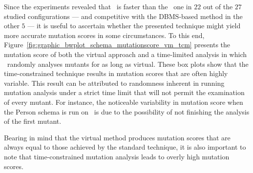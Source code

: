 


% 

 Since the experiments revealed that \vma~is faster than the \Original~one in $22$ out of the $27$ studied configurations --- and competitive with the DBMS-based method in the other $5$ --- it is useful to ascertain whether the presented technique might yield more accurate mutation scores in some circumstances. To this end, Figure~\ref{fig:graphic_bwplot_schema_mutationscore_vm_tcm} presents the mutation score of both the virtual approach and a time-limited analysis in which \Original~randomly analyses mutants for as long as virtual. These box plots show that the time-constrained technique results in mutation scores that are often highly variable. This result can be attributed to randomness inherent in running mutation analysis under a strict time limit that will not permit the examination of every mutant. For instance, the noticeable variability in mutation score when the Person schema is run on \Postgres~is due to the possibility of not finishing the analysis of the first mutant.

Bearing in mind that the virtual method produces mutation scores that are always equal to those achieved by the standard technique, it is also important to note that time-constrained mutation analysis leads to overly high mutation scores.





